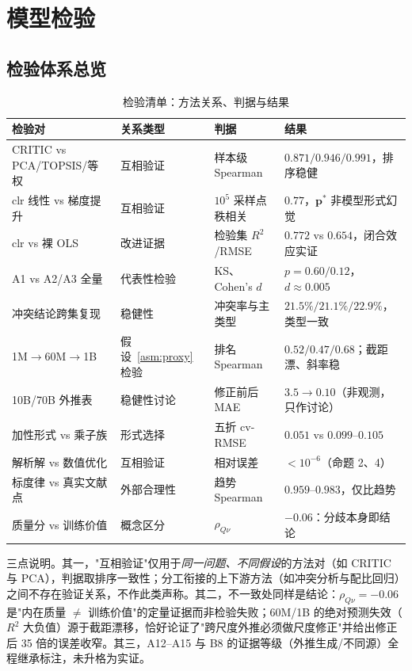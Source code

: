 \section{模型检验}

\subsection{检验体系总览}

\begin{table}[H]
\centering\small
\caption{检验清单：方法关系、判据与结果}
\begin{tabular}{p{3.6cm}p{2.1cm}p{3.4cm}p{4.6cm}}
\toprule
检验对 & 关系类型 & 判据 & 结果 \\
\midrule
CRITIC vs PCA/TOPSIS/等权 & 互相验证 & 样本级 Spearman & $0.871/0.946/0.991$，排序稳健 \\
clr 线性 vs 梯度提升 & 互相验证 & $10^5$ 采样点秩相关 & $0.77$，$\bm p^*$ 非模型形式幻觉 \\
clr vs 裸 OLS & 改进证据 & 检验集 $R^2$/RMSE & $0.772$ vs $0.654$，闭合效应实证 \\
A1 vs A2/A3 全量 & 代表性检验 & KS、Cohen's $d$ & $p=0.60/0.12$，$d\approx0.005$ \\
冲突结论跨集复现 & 稳健性 & 冲突率与主类型 & $21.5\%/21.1\%/22.9\%$，类型一致 \\
1M$\to$60M$\to$1B & 假设~\ref{asm:proxy} 检验 & 排名 Spearman & $0.52/0.47/0.68$；截距漂、斜率稳 \\
10B/70B 外推表 & 稳健性讨论 & 修正前后 MAE & $3.5\to0.10$（非观测，只作讨论） \\
加性形式 vs 乘子族 & 形式选择 & 五折 cv-RMSE & $0.051$ vs $0.099$--$0.105$ \\
解析解 vs 数值优化 & 互相验证 & 相对误差 & $<10^{-6}$（命题 2、4） \\
标度律 vs 真实文献点 & 外部合理性 & 趋势 Spearman & $0.959$--$0.983$，仅比趋势 \\
质量分 vs 训练价值 & 概念区分 & $\rho_{Q\nu}$ & $-0.06$：分歧本身即结论 \\
\bottomrule
\end{tabular}
\label{tab:checks}
\end{table}

三点说明。其一，"互相验证"仅用于\emph{同一问题、不同假设}的方法对（如 CRITIC 与 PCA），判据取排序一致性；分工衔接的上下游方法（如冲突分析与配比回归）之间不存在验证关系，不作此类声称。其二，不一致处同样是结论：$\rho_{Q\nu}=-0.06$ 是"内在质量 $\ne$ 训练价值"的定量证据而非检验失败；60M/1B 的绝对预测失效（$R^2$ 大负值）源于截距漂移，恰好论证了"跨尺度外推必须做尺度修正"并给出修正后 35 倍的误差收窄。其三，A12--A15 与 B8 的证据等级（外推生成/不同源）全程继承标注，未升格为实证。

